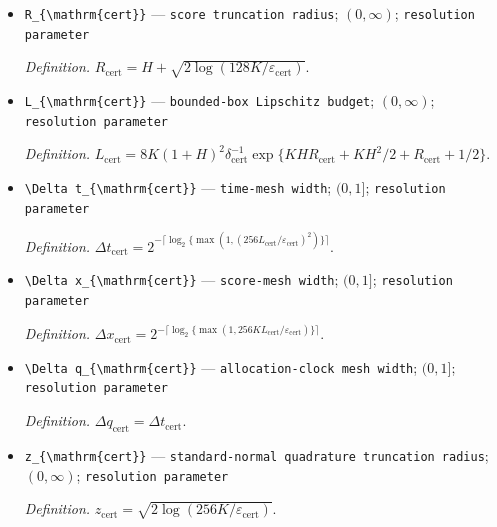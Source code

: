 \documentclass{article}
\begin{document}
\begin{itemize}
  \item \texttt{R\_\allowbreak{}\{\textbackslash{}\allowbreak{}mathrm\{cert\}\allowbreak{}\}\allowbreak{}} --- \texttt{score truncation radius}; \((0,\infty)\); \texttt{resolution parameter}
  \par\smallskip\noindent\emph{Definition.} \(R_{\mathrm{cert}}=H+\sqrt{2\log(128K/\varepsilon_{\mathrm{cert}})}\).
  \item \texttt{L\_\allowbreak{}\{\textbackslash{}\allowbreak{}mathrm\{cert\}\allowbreak{}\}\allowbreak{}} --- \texttt{bounded-\allowbreak{}box Lipschitz budget}; \((0,\infty)\); \texttt{resolution parameter}
  \par\smallskip\noindent\emph{Definition.} \(L_{\mathrm{cert}}=8K(1+H)^2\delta_{\mathrm{cert}}^{-1}\exp\{KHR_{\mathrm{cert}}+KH^2/2+R_{\mathrm{cert}}+1/2\}\).
  \item \texttt{\textbackslash{}\allowbreak{}Delta t\_\allowbreak{}\{\textbackslash{}\allowbreak{}mathrm\{cert\}\allowbreak{}\}\allowbreak{}} --- \texttt{time-\allowbreak{}mesh width}; \((0,1]\); \texttt{resolution parameter}
  \par\smallskip\noindent\emph{Definition.} \(\Delta t_{\mathrm{cert}}=2^{-\lceil\log_2\{\max(1,(256L_{\mathrm{cert}}/\varepsilon_{\mathrm{cert}})^2)\}\rceil}\).
  \item \texttt{\textbackslash{}\allowbreak{}Delta x\_\allowbreak{}\{\textbackslash{}\allowbreak{}mathrm\{cert\}\allowbreak{}\}\allowbreak{}} --- \texttt{score-\allowbreak{}mesh width}; \((0,1]\); \texttt{resolution parameter}
  \par\smallskip\noindent\emph{Definition.} \(\Delta x_{\mathrm{cert}}=2^{-\lceil\log_2\{\max(1,256KL_{\mathrm{cert}}/\varepsilon_{\mathrm{cert}})\}\rceil}\).
  \item \texttt{\textbackslash{}\allowbreak{}Delta q\_\allowbreak{}\{\textbackslash{}\allowbreak{}mathrm\{cert\}\allowbreak{}\}\allowbreak{}} --- \texttt{allocation-\allowbreak{}clock mesh width}; \((0,1]\); \texttt{resolution parameter}
  \par\smallskip\noindent\emph{Definition.} \(\Delta q_{\mathrm{cert}}=\Delta t_{\mathrm{cert}}\).
  \item \texttt{z\_\allowbreak{}\{\textbackslash{}\allowbreak{}mathrm\{cert\}\allowbreak{}\}\allowbreak{}} --- \texttt{standard-\allowbreak{}normal quadrature truncation radius}; \((0,\infty)\); \texttt{resolution parameter}
  \par\smallskip\noindent\emph{Definition.} \(z_{\mathrm{cert}}=\sqrt{2\log(256K/\varepsilon_{\mathrm{cert}})}\).

\end{itemize}
\end{document}
